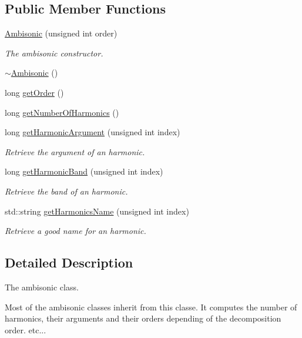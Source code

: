 \subsection*{Public Member Functions}
\begin{DoxyCompactItemize}
\item 
\hyperlink{class_hoa2_d_1_1_ambisonic_a43f91832422c0b59f92f02978dc1e541}{Ambisonic} (unsigned int order)
\begin{DoxyCompactList}\small\item\em The ambisonic constructor. \end{DoxyCompactList}\item 
\hyperlink{class_hoa2_d_1_1_ambisonic_a082fc2e3f9910703ddb49b9a478329bf}{$\sim$\-Ambisonic} ()
\item 
long \hyperlink{class_hoa2_d_1_1_ambisonic_a677405a1c3aa359753bd675d4614e7da}{get\-Order} ()
\item 
long \hyperlink{class_hoa2_d_1_1_ambisonic_aa9d613f38e6876326201995a5a415410}{get\-Number\-Of\-Harmonics} ()
\item 
long \hyperlink{class_hoa2_d_1_1_ambisonic_a3acaabfd013671c94e057e23eea1d068}{get\-Harmonic\-Argument} (unsigned int index)
\begin{DoxyCompactList}\small\item\em Retrieve the argument of an harmonic. \end{DoxyCompactList}\item 
long \hyperlink{class_hoa2_d_1_1_ambisonic_a06ecceb7aef44cd7008fd8beaf8cf33e}{get\-Harmonic\-Band} (unsigned int index)
\begin{DoxyCompactList}\small\item\em Retrieve the band of an harmonic. \end{DoxyCompactList}\item 
std\-::string \hyperlink{class_hoa2_d_1_1_ambisonic_a1b4578538f4fd0d311102b2f3ec4dac6}{get\-Harmonics\-Name} (unsigned int index)
\begin{DoxyCompactList}\small\item\em Retrieve a good name for an harmonic. \end{DoxyCompactList}\end{DoxyCompactItemize}


\subsection{Detailed Description}
The ambisonic class. 

Most of the ambisonic classes inherit from this classe. It computes the number of harmonics, their arguments and their orders depending of the decomposition order. etc... 

